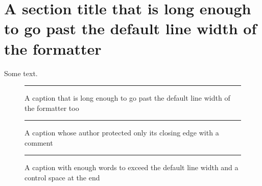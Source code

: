 \documentclass{article}
\begin{document}
\tableofcontents
\listoffigures

\section{A section title that is long enough to go past the default line width of the formatter}

Some text.

\begin{figure}[h]
  \centering
  \rule{1cm}{1cm}
  \caption{A caption that is long enough to go past the default line width of the formatter too}
\end{figure}

\begin{figure}[h]
  \centering
  \rule{1cm}{1cm}
  \caption{A caption whose author protected only its closing edge with a comment%
  }
\end{figure}

\begin{figure}[h]
  \centering
  \rule{1cm}{1cm}
  \caption{A caption with enough words to exceed the default line width and a control space at the end\
  }
\end{figure}
\end{document}
